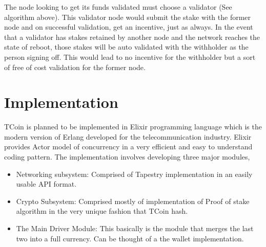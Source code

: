 \documentclass[conference,a4paper,12pt]{IEEEtran}
\begin{document}
	The node looking to get its funds validated must choose a validator (See algorithm above). This validator node would submit the stake with the former node and on successful validation, get an incentive, just as always. In the event that a validator has stakes retained by another node and the network reaches the state of reboot, those stakes will be auto validated with the withholder as the person signing off. This would lead to no incentive for the withholder but a sort of free of cost validation for the former node.

\section{Implementation}

	TCoin is planned to be implemented in Elixir programming language \cite{elixir} which is the modern version of Erlang developed for the telecommunication industry. Elixir provides Actor model of concurrency in a very efficient and easy to understand coding pattern. The implementation involves developing three major modules,
	\begin{itemize}
	\item{Networking subsystem: }
	Comprised of Tapestry implementation in an easily usable API format.
	\item{Crypto Subsystem: }
	Comprised mostly of implementation of Proof of stake algorithm in the very unique fashion that TCoin hash.
	\item{The Main Driver Module: }
	This basically is the module that merges the last two into a full currency. Can be thought of a the wallet implementation.
	\end{itemize}
	
\end{document}
